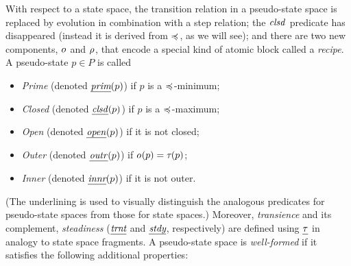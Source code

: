 \documentclass{article}
\begin{document}
With respect to a state space, the transition relation in a pseudo-state space is replaced by evolution in combination with a step relation; the $\mathit{clsd}_{}$ predicate has disappeared (instead it is derived from $\preccurlyeq_{}$, as we will see); and there are two new components, $o_{\!\,}$ and $\rho_{\!\,}$, that encode a special kind of atomic block called a \emph{recipe}. A pseudo-state $p\in P$ is called
%
\begin{itemize}
\item \emph{Prime} (denoted $\pPrime(p)$) if $p$ is a $\preccurlyeq_{}$-minimum;
\item \emph{Closed} (denoted $\pClosed(p)$) if $p$ is a $\preccurlyeq_{}$-maximum;
\item \emph{Open} (denoted $\pOpen(p)$) if it is not closed;
\item \emph{Outer} (denoted $\pOuter(p)$) if $o_{\!\,}(p)=\tau_{}(p)$;
\item \emph{Inner} (denoted $\pInner(p)$) if it is not outer.
\end{itemize}
%
(The underlining is used to visually distinguish the analogous predicates for pseudo-state spaces from those for state spaces.) Moreover, \emph{transience} and its complement, \emph{steadiness} ($\pTransient$ and $\pSteady$, respectively) are defined using $\pTLevel$ in analogy to state space fragments. A pseudo-state space is \emph{well-formed} if it satisfies the following additional properties:
%
\end{document}
